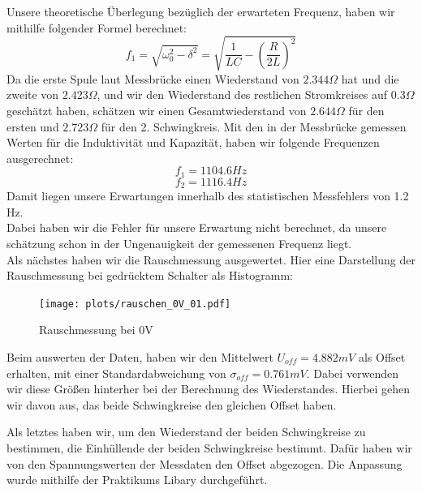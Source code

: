 \documentclass[twoside]{protokoll}
\begin{document}
Unsere theoretische Überlegung bezüglich der erwarteten Frequenz, haben wir mithilfe folgender Formel berechnet:
\begin{equation}
    f_1 = \sqrt{\omega_0^2 - \delta^2} = \sqrt{ \frac{1}{LC} - \left( \frac{R}{2L} \right)^2}
\end{equation}
Da die erste Spule laut Messbrücke einen Wiederstand von $ 2.344  \Omega$ hat und die zweite von $2.423 \Omega$, und wir den Wiederstand des restlichen Stromkreises auf $0.3 \Omega$ geschätzt haben, schätzen wir einen Gesamtwiederstand von $ 2.644 \Omega$ für den ersten und $ 2.723 \Omega$ für den 2. Schwingkreis.
Mit den in der Messbrücke gemessen Werten für die Induktivität und Kapazität, haben wir folgende Frequenzen ausgerechnet:
\begin{equation}
    f_1 = 1104.6 Hz
\end{equation}
\begin{equation}
    f_2 = 1116.4 Hz
\end{equation}
Damit liegen unsere Erwartungen innerhalb des statistischen Messfehlers von 1.2 Hz. \\
Dabei haben wir die Fehler für unsere Erwartung nicht berechnet, da unsere schätzung schon in der Ungenauigkeit der gemessenen Frequenz liegt. \\

Als nächstes haben wir die Rauschmessung ausgewertet. Hier eine Darstellung der Rauschmessung bei gedrücktem Schalter als Histogramm:
\begin{figure}[H]
    \centering
    \texttt{[image: plots/rauschen\_0V\_01.pdf]}
    \caption{Rauschmessung bei 0V}
\end{figure}
Beim auswerten der Daten, haben wir den Mittelwert $ U_{off} = 4.882 mV$ als Offset erhalten, mit einer Standardabweichung von $\sigma_{off} = 0.761 mV$.
Dabei verwenden wir diese Größen hinterher bei der Berechnung des Wiederstandes.
Hierbei gehen wir davon aus, das beide Schwingkreise den gleichen Offset haben.

Als letztes haben wir, um den Wiederstand der beiden Schwingkreise zu bestimmen, die Einhüllende der beiden Schwingkreise bestimmt.
Dafür haben wir von den Spannungswerten der Messdaten den Offset abgezogen.
Die Anpassung wurde mithilfe der Praktikums Libary durchgeführt.
 
\end{document}
